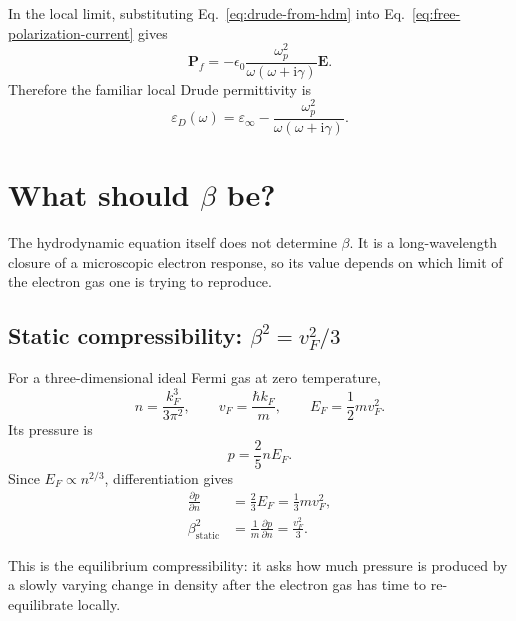 \documentclass[11pt,a4paper]{article}
\newcommand{\E}{\mathbf E}
\newcommand{\Pfield}{\mathbf P}
\newcommand{\ii}{\mathrm i}
\newcommand{\eps}{\varepsilon}
\newcommand{\epsinf}{\varepsilon_\infty}
\newcommand{\omegap}{\omega_p}
\newcommand{\vF}{v_F}
\begin{document}
In the local limit, substituting Eq.~\eqref{eq:drude-from-hdm} into
Eq.~\eqref{eq:free-polarization-current} gives
\begin{equation}
    \Pfield_f
    =-\epsilon_0
      \frac{\omegap^2}{\omega(\omega+\ii\gamma)}\E.
    \label{eq:local-free-polarization}
\end{equation}
Therefore the familiar local Drude permittivity is
\begin{equation}
    \boxed{
    \eps_D(\omega)
    =\epsinf-
      \frac{\omegap^2}{\omega(\omega+\ii\gamma)}.
    }
    \label{eq:drude-permittivity}
\end{equation}

\section{What should \texorpdfstring{$\beta$}{beta} be?}

The hydrodynamic equation itself does not determine \(\beta\).  It is a
long-wavelength closure of a microscopic electron response, so its value
depends on which limit of the electron gas one is trying to reproduce.

\subsection{Static compressibility: \texorpdfstring{$\beta^2=\vF^2/3$}{beta2=vF2/3}}

For a three-dimensional ideal Fermi gas at zero temperature,
\begin{equation}
    n=\frac{k_F^3}{3\pi^2},
    \qquad
    \vF=\frac{\hbar k_F}{m},
    \qquad
    E_F=\frac{1}{2}m\vF^2.
    \label{eq:fermi-definitions}
\end{equation}
Its pressure is
\begin{equation}
    p=\frac{2}{5}nE_F.
    \label{eq:fermi-pressure}
\end{equation}
Since \(E_F\propto n^{2/3}\), differentiation gives
\begin{align}
    \frac{\partial p}{\partial n}
    &=\frac{2}{3}E_F
      =\frac{1}{3}m\vF^2,\\
    \beta_{\mathrm{static}}^2
    &=\frac{1}{m}\frac{\partial p}{\partial n}
      =\frac{\vF^2}{3}.
    \label{eq:beta-static}
\end{align}

This is the equilibrium compressibility: it asks how much pressure is produced
by a slowly varying change in density after the electron gas has time to
re-equilibrate locally.
\end{document}

